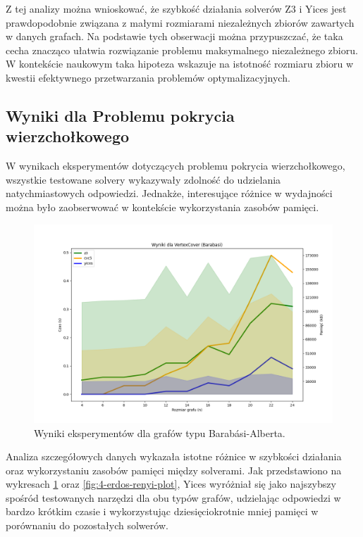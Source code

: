 Z tej analizy można wnioskować, że szybkość działania solverów Z3 i Yices jest prawdopodobnie związana z małymi rozmiarami niezależnych zbiorów zawartych w danych grafach. Na podstawie tych obserwacji można przypuszczać, że taka cecha znacząco ułatwia rozwiązanie problemu maksymalnego niezależnego zbioru. W kontekście naukowym taka hipoteza wskazuje na istotność rozmiaru zbioru w kwestii efektywnego przetwarzania problemów optymalizacyjnych.


\subsection{Wyniki dla Problemu pokrycia wierzchołkowego}

W wynikach eksperymentów dotyczących problemu pokrycia wierzchołkowego, wszystkie testowane solvery wykazywały zdolność do udzielania natychmiastowych odpowiedzi. Jednakże, interesujące różnice w wydajności można było zaobserwować w kontekście wykorzystania zasobów pamięci.

\begin{figure}[htbp]
	\centering
	\begin{minipage}{\textwidth}
		\includegraphics[width=\textwidth]{./figures/5-barabasi-plot.png}
		\caption{Wyniki eksperymentów dla grafów typu Barabási-Alberta.}
		\label{fig:5-barabasi-plot}
	\end{minipage}
\end{figure}

Analiza szczegółowych danych wykazała istotne różnice w szybkości działania oraz wykorzystaniu zasobów pamięci między solverami. Jak przedstawiono na wykresach \ref{fig:5-barabasi-plot} oraz \ref{fig:4-erdos-renyi-plot}, Yices wyróżniał się jako najszybszy spośród testowanych narzędzi dla obu typów grafów, udzielając odpowiedzi w bardzo krótkim czasie i wykorzystując dziesięciokrotnie mniej pamięci w porównaniu do pozostałych solwerów.

